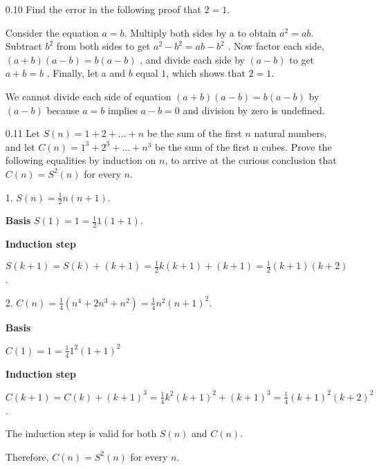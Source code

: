 
\begin{enumerate}

      \item[0.10]
            Find the error in the following proof that $2 = 1$.
            
            Consider the equation $a = b$. Multiply both sides by a to obtain
            $a^2 = ab$.
            Subtract
            $b^2$
            from both sides to get
            $a^2 - b^2 = ab - b^2$
            . Now factor each side,
            $(a + b)(a - b) = b(a - b)$
            , and divide each side by
            $(a - b)$
            to get
            $a + b = b$
            . Finally, let a and $b$ equal $1$, which shows that $2 = 1$.
            
            
            We cannot divide each side of equation $(a + b)(a - b) = b(a - b)$ by $(a - b)$ because $a = b$ implies $a - b = 0$ and division by zero is undefined.
            
      \item[0.11]
            Let $S(n) = 1 + 2 + \ldots + n$ be the sum of the first $n$ natural numbers, and let $C(n) = 1^3 + 2^3 + \ldots + n^3$ be the sum of the first n cubes. Prove the following equalities by induction on $n$, to arrive at the curious conclusion that $C(n) = S^2(n)$ for every $n$.
            
            1. $S(n) = \frac{1}{2} n(n+1)$.
            
            \textbf{Basis}
            $ S(1) = 1 = \frac{1}{2} 1(1+1)$.
            
            \textbf{Induction step}
            
            $ S(k+1) = S(k) + (k+1) = \frac{1}{2} k(k+1) + (k+1) = \frac{1}{2} (k+1)(k+2)$.
            
            2. $C(n) = \frac{1}{4}(n^4 + 2n^3 + n^2) = \frac{1}{4} n^2(n+1)^2$.
            
            \textbf{Basis}
            
            $ C(1) = 1 = \frac{1}{4} 1^2(1+1)^2$
            
            \textbf{Induction step}
            
            $ C(k+1) = C(k) + (k+1)^3 = \frac{1}{4} k^2(k+1)^2 + (k+1)^3 = \frac{1}{4} (k+1)^2(k+2)^2$.
            
            The induction step is valid for both $S(n)$ and $C(n)$.
            
            Therefore, $C(n) = S^2(n)$ for every $n$.
            

\end{enumerate}
